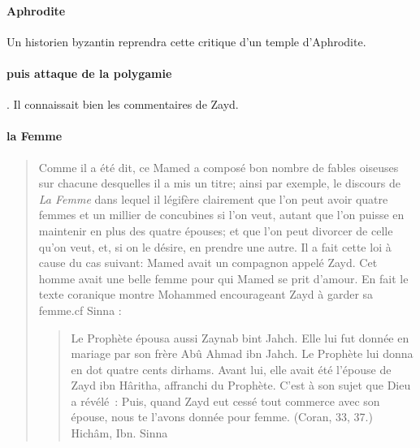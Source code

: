 \paragraph{Aphrodite} Un historien byzantin reprendra cette critique d'un temple d'Aphrodite.

\paragraph{puis attaque de la polygamie}. 
Il connaissait bien les commentaires de Zayd. 

    

\paragraph{la Femme}
\begin{quote}

Comme il a été dit, ce Mamed a composé bon nombre de fables oiseuses sur chacune desquelles il a mis un titre; ainsi par exemple, le discours de \textit{La Femme} dans lequel il légifère clairement que l'on peut avoir quatre femmes et un millier de concubines si l'on veut, autant que l'on puisse en maintenir en plus des quatre épouses; et que l'on peut divorcer de celle qu'on veut, et, si on le désire, en prendre une autre. Il a fait cette loi à cause du cas suivant: Mamed avait un compagnon appelé Zayd. Cet homme avait une belle femme pour qui Mamed se prit d'amour. En fait le texte coranique montre Mohammed encourageant Zayd à
garder sa femme.cf Sinna : 
\begin{quote}
Le Prophète épousa aussi Zaynab bint Jahch. Elle lui fut donnée en mariage par son frère Abû Ahmad ibn Jahch. Le Prophète lui donna en dot quatre cents dirhams. Avant lui, elle avait été l'épouse de Zayd ibn Hâritha, affranchi du Prophète. C'est à son sujet que Dieu a révélé : Puis, quand Zayd eut cessé tout commerce avec son épouse, nous te l'avons donnée pour femme. (Coran, 33, 37.)
Hichâm, Ibn. Sinna 
\end{quote}


\end{quote}

